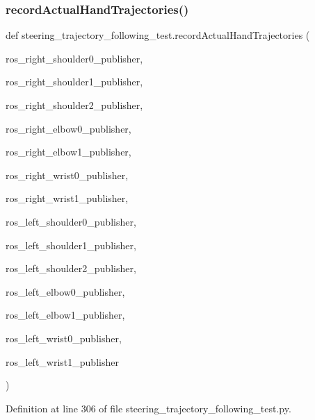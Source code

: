 \subsubsection{\texorpdfstring{recordActualHandTrajectories()}{recordActualHandTrajectories()}}
{\footnotesize\ttfamily def steering\+\_\+trajectory\+\_\+following\+\_\+test.\+record\+Actual\+Hand\+Trajectories (\begin{DoxyParamCaption}\item[{}]{ros\+\_\+right\+\_\+shoulder0\+\_\+publisher,  }\item[{}]{ros\+\_\+right\+\_\+shoulder1\+\_\+publisher,  }\item[{}]{ros\+\_\+right\+\_\+shoulder2\+\_\+publisher,  }\item[{}]{ros\+\_\+right\+\_\+elbow0\+\_\+publisher,  }\item[{}]{ros\+\_\+right\+\_\+elbow1\+\_\+publisher,  }\item[{}]{ros\+\_\+right\+\_\+wrist0\+\_\+publisher,  }\item[{}]{ros\+\_\+right\+\_\+wrist1\+\_\+publisher,  }\item[{}]{ros\+\_\+left\+\_\+shoulder0\+\_\+publisher,  }\item[{}]{ros\+\_\+left\+\_\+shoulder1\+\_\+publisher,  }\item[{}]{ros\+\_\+left\+\_\+shoulder2\+\_\+publisher,  }\item[{}]{ros\+\_\+left\+\_\+elbow0\+\_\+publisher,  }\item[{}]{ros\+\_\+left\+\_\+elbow1\+\_\+publisher,  }\item[{}]{ros\+\_\+left\+\_\+wrist0\+\_\+publisher,  }\item[{}]{ros\+\_\+left\+\_\+wrist1\+\_\+publisher }\end{DoxyParamCaption})}



Definition at line 306 of file steering\+\_\+trajectory\+\_\+following\+\_\+test.\+py.


